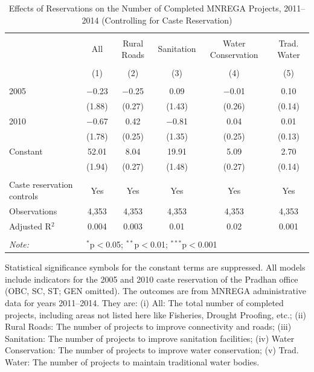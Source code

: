 \begin{table}[!htbp]
\centering
\begin{threeparttable}

  \caption{Effects of Reservations on the Number of Completed MNREGA Projects, 2011--2014 (Controlling for Caste Reservation)} 
  \label{main_mnrega_caste_ctrl} 
\scriptsize 
\begin{tabular}{@{\extracolsep{0pt}}lccccc} 
\\[-1.8ex]\hline 
\hline \\[-1.8ex] 
 & All & Rural Roads & Sanitation & Water Conservation & Trad. Water \\ 
\\[-1.8ex] & (1) & (2) & (3) & (4) & (5)\\ 
\hline \\[-1.8ex] 
 2005 & $-$0.23 & $-$0.25 & 0.09 & $-$0.01 & 0.10 \\ 
  & (1.88) & (0.27) & (1.43) & (0.26) & (0.14) \\ 
  2010 & $-$0.67 & 0.42 & $-$0.81 & 0.04 & 0.01 \\ 
  & (1.78) & (0.25) & (1.35) & (0.25) & (0.13) \\ 
  Constant & 52.01 & 8.04 & 19.91 & 5.09 & 2.70 \\ 
  & (1.94) & (0.27) & (1.48) & (0.27) & (0.14) \\ 
 \hline \\[-1.8ex] 
Caste reservation controls & Yes & Yes & Yes & Yes & Yes \\ 
Observations & 4,353 & 4,353 & 4,353 & 4,353 & 4,353 \\ 
Adjusted R$^{2}$ & 0.004 & 0.003 & 0.01 & 0.02 & 0.001 \\ 
\hline 
\hline \\[-1.8ex] 
\textit{Note:}  & \multicolumn{5}{l}{$^{*}$p$<$0.05; $^{**}$p$<$0.01; $^{***}$p$<$0.001} \\ 
\end{tabular} 
\begin{tablenotes}[flushleft]
\scriptsize
\item[] Statistical significance symbols for the constant terms are suppressed. All models include indicators for the 2005 and 2010 caste reservation of the Pradhan office (OBC, SC, ST; GEN omitted). The outcomes are from MNREGA administrative data for years 2011--2014. They are: 
(i) All: The total number of completed projects, including areas not listed here like Fisheries, Drought Proofing, etc.;
(ii) Rural Roads: The number of projects to improve connectivity and roads;
(iii) Sanitation: The number of projects to improve sanitation facilities;
(iv) Water Conservation: The number of projects to improve water conservation;
(v) Trad. Water: The number of projects to maintain traditional water bodies.
\end{tablenotes}
\end{threeparttable}
\end{table}

